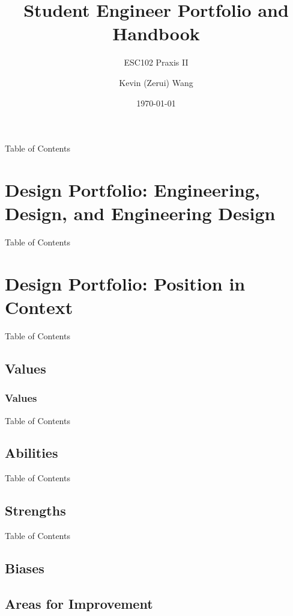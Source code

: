 \documentclass[aspectratio=1610]{beamer}
\title[Student Engineer Portfolio and Handbook]{Student Engineer Portfolio and Handbook}
\subtitle{ESC102 Praxis II}
\author[Page \insertframenumber]{Kevin (Zerui) Wang}
\institute{University of Toronto}
\date{\today}
\begin{document}
{
\begin{frame}
\titlepage
\end{frame}
}
\addtocounter{framenumber}{-1}

{
\begin{frame}{Table of Contents}
    \tableofcontents
\end{frame}
}

\section{Design Portfolio: Engineering, Design, and Engineering Design}

\begin{frame}{Table of Contents}
\end{frame}
\section{Design Portfolio: Position in Context}
\begin{frame}{Table of Contents}
\end{frame}
\subsection{Values}
\subsubsection{Values}
\begin{frame}{Table of Contents}
\end{frame}
\subsection{Abilities}
\begin{frame}{Table of Contents}
\end{frame}
\subsection{Strengths}
\begin{frame}{Table of Contents}
\end{frame}
\subsection{Biases}
\subsection{Areas for Improvement}
\end{document}
